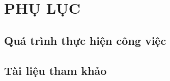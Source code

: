 
\newpage
\chapter{PHỤ LỤC}

\section{Quá trình thực hiện công việc}

\section{Tài liệu tham khảo}

\begin{thebibliography}{}

\end{thebibliography}



